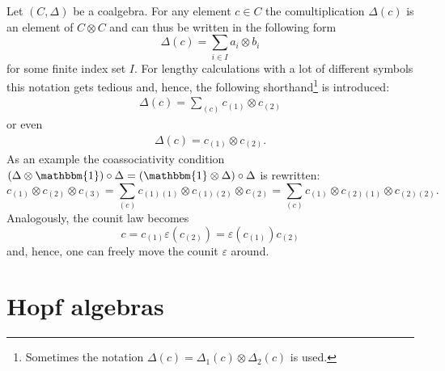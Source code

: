 
    \begin{notation}
        Let $(C,\Delta)$ be a coalgebra. For any element $c\in C$ the comultiplication $\Delta(c)$ is an element of $C\otimes C$ and can thus be written in the following form \[\Delta(c) = \sum_{i\in I}a_i\otimes b_i\] for some finite index set $I$. For lengthy calculations with a lot of different symbols this notation gets tedious and, hence, the following shorthand\footnote{Sometimes the notation $\Delta(c) = \Delta_1(c)\otimes\Delta_2(c)$ is used.} is introduced:
        \begin{gather}
            \Delta(c) = \sum_{(c)}c_{(1)}\otimes c_{(2)}
        \end{gather}
        or even
        \begin{gather}
            \Delta(c) = c_{(1)}\otimes c_{(2)}.
        \end{gather}
        As an example the coassociativity condition $(\Delta\otimes\mathbbm{1})\circ\Delta = (\mathbbm{1}\otimes\Delta)\circ\Delta$ is rewritten: \[c_{(1)}\otimes c_{(2)}\otimes c_{(3)} = \sum_{(c)} c_{(1)(1)}\otimes c_{(1)(2)}\otimes c_{(2)} = \sum_{(c)} c_{(1)}\otimes c_{(2)(1)}\otimes c_{(2)(2)}.\] Analogously, the counit law becomes \[c = c_{(1)}\varepsilon(c_{(2)}) = \varepsilon(c_{(1)})c_{(2)}\] and, hence, one can freely move the counit $\varepsilon$ around.
    \end{notation}

\section{Hopf algebras}


